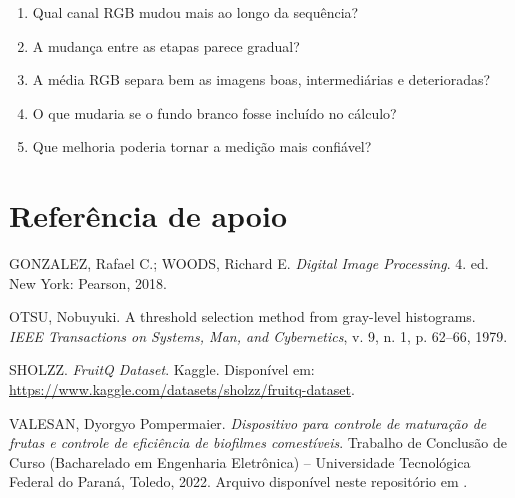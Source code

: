 \documentclass[12pt]{article}
\begin{document}
\begin{enumerate}
  \item Qual canal RGB mudou mais ao longo da sequência?
  \item A mudança entre as etapas parece gradual?
  \item A média RGB separa bem as imagens boas, intermediárias e deterioradas?
  \item O que mudaria se o fundo branco fosse incluído no cálculo?
  \item Que melhoria poderia tornar a medição mais confiável?
\end{enumerate}

\section{Referência de apoio}

GONZALEZ, Rafael C.; WOODS, Richard E. \textit{Digital Image Processing}. 4. ed. New York: Pearson, 2018.

OTSU, Nobuyuki. A threshold selection method from gray-level histograms. \textit{IEEE Transactions on Systems, Man, and Cybernetics}, v. 9, n. 1, p. 62--66, 1979.

SHOLZZ. \textit{FruitQ Dataset}. Kaggle. Disponível em: \url{https://www.kaggle.com/datasets/sholzz/fruitq-dataset}.

VALESAN, Dyorgyo Pompermaier. \textit{Dispositivo para controle de maturação de frutas e controle de eficiência de biofilmes comestíveis}. Trabalho de Conclusão de Curso (Bacharelado em Engenharia Eletrônica) -- Universidade Tecnológica Federal do Paraná, Toledo, 2022. Arquivo disponível neste repositório em .
\end{document}
